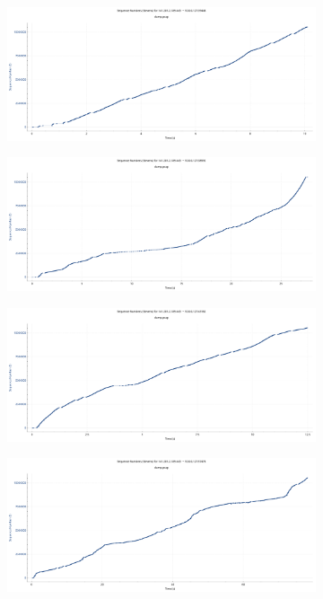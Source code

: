 \documentclass[
    pdftex,
    12pt,
    parskip=half,
    a4paper
]{scrartcl}
\begin{document}
\begin{figure}
\begin{subfigure}{0.5\textwidth}
	\end{subfigure}
	\begin{subfigure}{0.5\textwidth}
		\includegraphics[width=1\textwidth]{../1/wireshark/variable5.pdf}
	\end{subfigure}
	\begin{subfigure}{0.5\textwidth}
		\includegraphics[width=1\textwidth]{../1/wireshark/variable6.pdf}
	\end{subfigure}
	\begin{subfigure}{0.5\textwidth}
		\includegraphics[width=1\textwidth]{../1/wireshark/variable7.pdf}
	\end{subfigure}
	\begin{subfigure}{0.5\textwidth}
		\includegraphics[width=1\textwidth]{../1/wireshark/variable8.pdf}

\end{subfigure}
\end{figure}
\end{document}
